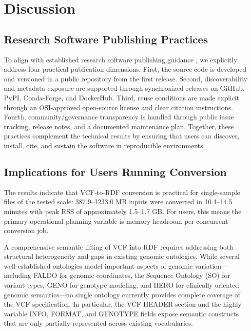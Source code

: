 \documentclass[unnumsec,webpdf,contemporary,large]{oup-authoring-template}
\begin{document}
\section{Discussion}\label{sec4}

\subsection{Research Software Publishing Practices}\label{subsec4.1}
To align with established research software publishing guidance \cite{jimenez_2017_f1000}, we explicitly address four practical publication dimensions.
First, the source code is developed and versioned in a public repository from the first release.
Second, discoverability and metadata exposure are supported through synchronized releases on GitHub, PyPI, Conda-Forge, and DockerHub.
Third, reuse conditions are made explicit through an OSI-approved open-source license and clear citation instructions.
Fourth, community/governance transparency is handled through public issue tracking, release notes, and a documented maintenance plan.
Together, these practices complement the technical results by ensuring that users can discover, install, cite, and sustain the software in reproducible environments.

\subsection{Implications for Users Running Conversion}\label{subsec4.2}
The results indicate that VCF-to-RDF conversion is practical for single-sample files of the tested scale: 387.9--1233.0 MB inputs were converted in 10.4--14.5 minutes with peak RSS of approximately 1.5--1.7 GB. For users, this means the primary operational planning variable is memory headroom per concurrent conversion job.

A comprehensive semantic lifting of VCF into RDF requires addressing both structural heterogeneity and gaps in existing genomic ontologies. 
While several well-established ontologies model important aspects of genomic variation—including FALDO for genomic coordinates, the Sequence Ontology (SO) for variant types, GENO for genotype modeling, and HERO for clinically oriented genomic semantics—no single ontology currently provides complete coverage of the VCF specification. 
In particular, the VCF HEADER section and the highly variable INFO, FORMAT, and GENOTYPE fields expose semantic constructs that are only partially represented across existing vocabularies.
\end{document}
